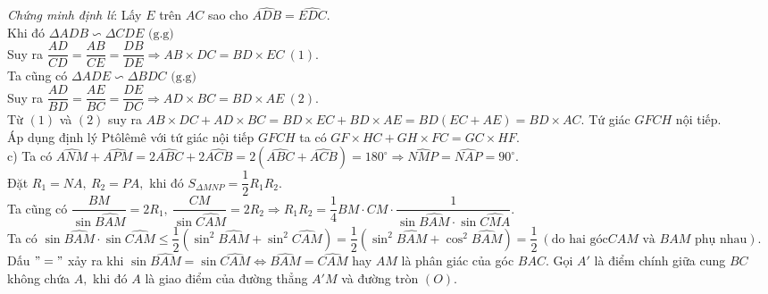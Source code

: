 \begin{ex}
{	\emph{Chứng minh định lí}: Lấy $E$ trên $AC$ sao cho $\widehat{ADB}=\widehat{EDC}.$\\
	Khi đó $\Delta ADB\backsim\Delta CDE\mbox{ (g.g)}$\\ Suy ra $\dfrac{AD}{CD}=\dfrac{AB}{CE}=\dfrac{DB}{DE}\Rightarrow AB\times DC=BD\times EC\ (1).$\\
	Ta cũng có $\Delta ADE\backsim\Delta BDC\mbox{ (g.g)}$\\ Suy ra 
	$\dfrac{AD}{BD}=\dfrac{AE}{BC}=\dfrac{DE}{DC}\Rightarrow AD\times BC=BD\times AE\ (2).$\\
	Từ $(1)$ và $(2)$ suy ra $AB\times DC+AD\times BC=BD\times EC+BD\times AE=BD(EC+AE)=BD\times AC.$ Tứ giác $GFCH$ nội tiếp.\\ Áp dụng định lý Ptôlêmê với tứ giác nội tiếp $GFCH$ ta có $GF\times HC+GH\times FC=GC\times HF.$\\
c) Ta có $\widehat{ANM}+\widehat{APM}=2\widehat{ABC}+2\widehat{ACB}=2(\widehat{ABC}+\widehat{ACB})=180^\circ\Rightarrow\widehat{NMP}=\widehat{NAP}=90^\circ.$\\ Đặt $R_1=NA,\ R_2=PA,$ khi đó $S_{\Delta MNP}=\dfrac{1}{2}R_1R_2.$ \\Ta cũng có
$\dfrac{BM}{\sin\widehat{BAM}}=2R_1,\ \dfrac{CM}{\sin\widehat{CAM}}=2R_2\Rightarrow R_1R_2=\dfrac{1}{4}BM\cdot CM\cdot\dfrac{1}{\sin\widehat{BAM}\cdot\sin\widehat{CMA}}.$\\
	Ta có $\sin\widehat{BAM}\cdot\sin\widehat{CAM}\leq\dfrac{1}{2}\left(\sin^2\widehat{BAM}+\sin^2\widehat{CAM}\right)=\dfrac{1}{2}\left(\sin^2\widehat{BAM}+\cos^2\widehat{BAM}\right)=\dfrac{1}{2}\ (\mbox{do hai góc} CAM\mbox{ và } BAM\mbox{ phụ nhau}).$\\
	Dấu $"="$ xảy ra khi $\sin\widehat{BAM}=\sin\widehat{CAM}\Leftrightarrow\widehat{BAM}=\widehat{CAM}$ hay $AM$ là phân giác của góc $BAC.$ Gọi $A'$ là điểm chính giữa cung $BC$ không chứa $A,$ khi đó $A$ là giao điểm của đường thẳng $A'M$ và đường tròn $(O).$
}
\end{ex}
